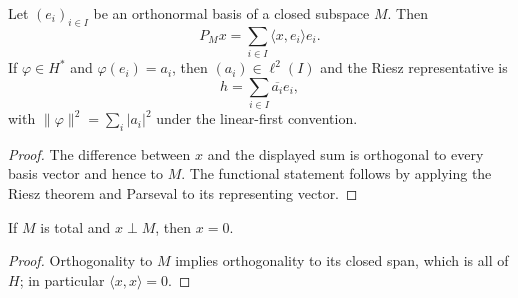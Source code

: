 \begin{notetheorem}
Let $(e_i)_{i\in I}$ be an orthonormal basis of a closed subspace $M$.  Then
\[
  P_Mx=\sum_{i\in I}\langle x,e_i\rangle e_i.
\]
If $\varphi\in H^*$ and $\varphi(e_i)=a_i$, then
$(a_i)\in\ell^2(I)$ and the Riesz representative is
\[
  h=\sum_{i\in I}\overline{a_i}e_i,
\]
with $\|\varphi\|^2=\sum_i|a_i|^2$ under the linear-first convention.
\end{notetheorem}

\begin{proof}
The difference between $x$ and the displayed sum is orthogonal to every basis
vector and hence to $M$.  The functional statement follows by applying the
Riesz theorem and Parseval to its representing vector.
\end{proof}

\begin{noteexercise}
If $M$ is total and $x\perp M$, then $x=0$.
\end{noteexercise}

\begin{proof}
Orthogonality to $M$ implies orthogonality to its closed span, which is all of
$H$; in particular $\langle x,x\rangle=0$.
\end{proof}
